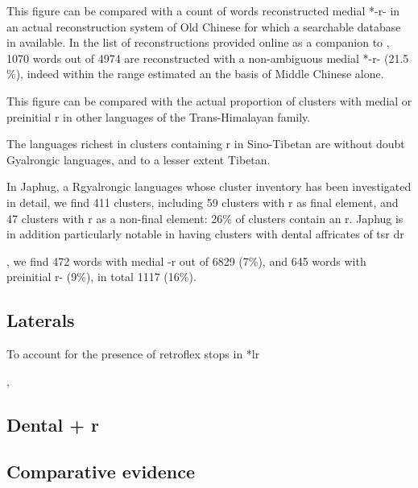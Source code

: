 \documentclass[oldfontcommands,oneside,a4paper,11pt]{article}
\newcommand{\ipa}[1]{{\phon \mbox{#1}}} %
\begin{document}
{This figure can be compared with a count of words reconstructed medial *\ipa{-r-} in an actual reconstruction system of Old Chinese for which a searchable database in available. In the list of reconstructions provided online as a companion to \citet{bs14oc}, 1070 words out of 4974 are reconstructed with a non-ambiguous medial *\ipa{-r-} (21.5 \%), indeed within the range estimated an the basis of Middle Chinese alone.

This figure can be compared with the actual proportion of clusters with medial or preinitial \ipa{r} in other languages of the Trans-Himalayan family.

The languages richest in clusters containing \ipa{r} in Sino-Tibetan are without doubt Gyalrongic languages, and to a lesser extent Tibetan.

In Japhug, a Rgyalrongic languages whose cluster inventory has been investigated in detail, we find 411 clusters, including 59 clusters with \ipa{r} as final element, and 47 clusters with \ipa{r} as a non-final element: 26\% of clusters contain an \ipa{r}. Japhug is in addition particularly notable in having clusters with dental affricates of tsr dr


\citet{jacques15japhug}, we find 472 words with medial \ipa{-r} out of 6829 (7\%), and 645 words with preinitial \ipa{r-} (9\%), in total 1117 (16\%).

\subsection{Laterals}
To account for the presence of retroflex stops in 
*lr

\citet[217-225]{starostin89}, \citet[36-40]{sagart99roc}


\citet[78]{baroni14invariant}

\citet{nikitina12logophoric}

\subsection{Dental + r}

%

\subsection{Comparative evidence}

}
\end{document}
